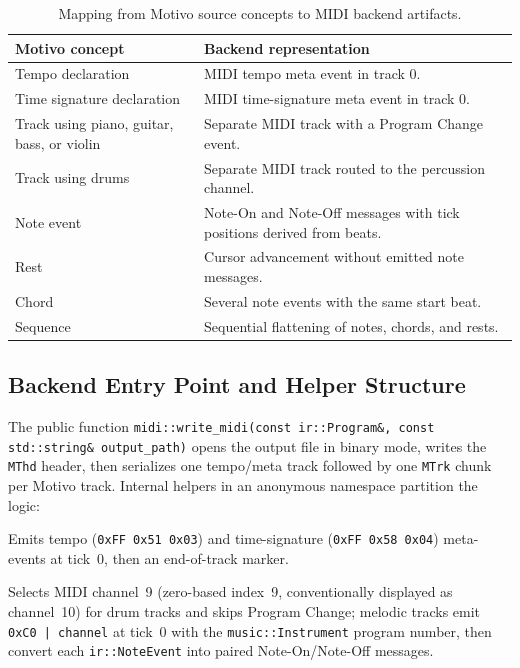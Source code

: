 \begin{table}[htbp]
  \centering
  \renewcommand{\arraystretch}{1.3}
  \begin{tabularx}{\textwidth}{@{}M{3.4cm}>{\raggedright\arraybackslash\hspace{0pt}}X@{}}
    \toprule
    \textbf{Motivo concept} & \textbf{Backend representation} \\
    \midrule
    Tempo declaration & MIDI tempo meta event in track 0. \\
    Time signature declaration & MIDI time-signature meta event in track 0. \\
    Track using piano, guitar, bass, or violin & Separate MIDI track with a Program Change event. \\
    Track using drums & Separate MIDI track routed to the percussion channel. \\
    Note event & Note-On and Note-Off messages with tick positions derived from beats. \\
    Rest & Cursor advancement without emitted note messages. \\
    Chord & Several note events with the same start beat. \\
    Sequence & Sequential flattening of notes, chords, and rests. \\
    \bottomrule
  \end{tabularx}
  \caption{Mapping from Motivo source concepts to MIDI backend artifacts.}\label{tab:motivo-midi-mapping}
\end{table}

\subsection{Backend Entry Point and Helper Structure}\label{detail-subsec:midi-write-entry}

The public function \texttt{midi::write\_midi(const ir::Program\&, const std::string\& output\_path)} opens the output
file in binary mode, writes the \texttt{MThd} header, then serializes one tempo/meta track followed by one \texttt{MTrk}
chunk per Motivo track.
Internal helpers in an anonymous namespace partition the logic:

 Emits tempo (\texttt{0xFF 0x51 0x03}) and time-signature
(\texttt{0xFF 0x58 0x04}) meta-events at tick~0, then an end-of-track marker.

 Selects MIDI channel~9 (zero-based index~9, conventionally displayed
as channel~10) for drum tracks and skips Program Change; melodic tracks emit \texttt{0xC0 | channel} at tick~0 with the
\texttt{music::Instrument} program number, then convert each \texttt{ir::NoteEvent} into paired Note-On/Note-Off
messages.

